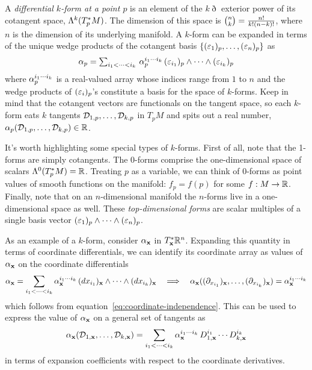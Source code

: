 \documentclass[11pt]{article}
\numberwithin{equation}{section}
\begin{document}
\begin{dfn}
A \textit{differential $k$-form at a point $p$} is an element of the $k\eth$ exterior power of its cotangent space, $\Lambda ^k(T_p^*M)$.
The dimension of this space is
$
  {n\choose k}
=
  \frac {n!}{k!(n-k)!}
$,
where $n$ is the dimension of its underlying manifold.
A $k$-form can be expanded in terms of the unique wedge products of the cotangent basis
$\{(\varepsilon_1)_p, \ldots, (\varepsilon_n)_p\}$
as
\begin{align}
{\textstyle
  \ensuremath{\alpha }_p
=
  \sum_{i_1<\ensuremath{\cdots}<i_k}\,
  \ensuremath{\alpha }_p^{i_1\ensuremath{\cdots}i_k}
  \,
  (\ensuremath{\varepsilon}_{i_1})_p
  \wedge
  \ensuremath{\cdots}\wedge
  (\ensuremath{\varepsilon}_{i_k})_p
}
\end{align}
where $\alpha _p^{i_1\cdots i_k}$ is a real-valued array whose indices range from $1$ to $n$ and the wedge products of $(\varepsilon_i)_p$'s constitute a basis for the space of $k$-forms.
Keep in mind that the cotangent vectors are functionals on the tangent space, so each $k$-form eats $k$ tangents $\mathcal{D}_{1,p},\ldots,\mathcal{D}_{k,p}$ in $T_pM$ and spits out a real number,
$
  \alpha _p(
    \mathcal{D}_{1,p}
  ,
    \ldots
  ,
    \mathcal{D}_{k,p}
  )
\in
  \mathbb{R}
$.
\end{dfn}

\begin{rmk}
It's worth highlighting some special types of $k$-forms.
First of all, note that the 1-forms are simply cotangents.
The 0-forms comprise the one-dimensional space of scalars $\Lambda ^0(T_p^* M)=\mathbb{R}$.
Treating $p$ as a variable, we can think of 0-forms as point values of smooth functions on the manifold: $f_p=f(p)$ for some $f:M\rightarrow\mathbb{R}$.
Finally, note that on an $n$-dimensional manifold the $n$-forms live in a one-dimensional space as well.
These \textit{top-dimensional forms} are scalar multiples of a single basis vector $(\varepsilon_1)_p\wedge\cdots\wedge(\varepsilon_n)_p$.
\end{rmk}

\begin{ex}
As an example of a $k$-form, consider $\alpha _{\mathbf{x}}$ in $T_{\mathbf{x}}^*\mathbb{R}^n$.
Expanding this quantity in terms of coordinate differentials, we can identify its coordinate array as values of $\alpha _{\mathbf{x}}$ on the coordinate differentials
\begin{align}
  \alpha _{\mathbf{x}}
=
  \sum_{i_1<\cdots<i_k}
  \alpha _{\mathbf{x}}^{i_1\cdots i_k}\,
  (dx_{i_1})_{\mathbf{x}}
  \wedge
  \cdots
  \wedge
  (dx_{i_k})_{\mathbf{x}}
&&
\implies
&&
  \alpha _{\mathbf{x}}
  (
    (\partial_{x_{i_1}})_{\mathbf{x}}
  ,
    \ldots
  ,
    (\partial_{x_{i_k}})_{\mathbf{x}}
  )
=
  \alpha _{\mathbf{x}}^{i_1\cdots i_k}
\end{align}
which follows from equation~\ref{eq:coordinate-independence}.
This can be used to express the value of $\alpha _{\mathbf{x}}$ on a general set of tangents as
\begin{align}
  \alpha _{\mathbf{x}}
  (
    \mathcal{D}_{1, \mathbf{x}}
  ,
    \ldots
  ,
    \mathcal{D}_{k, \mathbf{x}}
  )
=
  \sum_{i_1<\cdots<i_k}
  \alpha _{\mathbf{x}}^{i_1\cdots i_k}\,
  D_{1, \mathbf{x}}^{i_1}
  \cdots
  D_{k, \mathbf{x}}^{i_k}
\end{align}
in terms of expansion coefficients with respect to the coordinate derivatives.
\end{ex}
\end{document}
